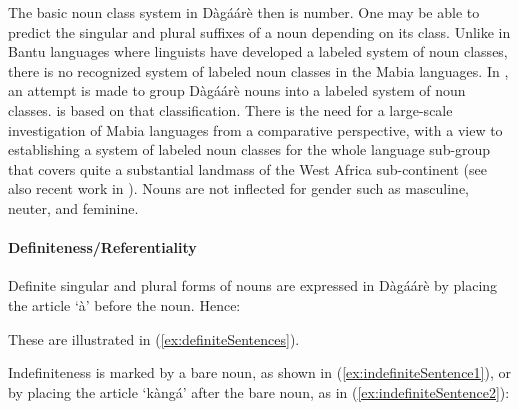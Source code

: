 \begin{refsection}
The basic noun class system in Dàgáárè then is number. One may be able to predict the
singular and plural suffixes of a noun depending on its class. Unlike in Bantu languages
where linguists have developed a labeled system of noun classes, there is no recognized
system of labeled noun classes in the Mabia languages. In \citet{Bodomo1997}, an attempt is made to group Dàgáárè nouns into a labeled system of noun classes.   is
based on that classification. There is the need for a large-scale investigation of Mabia languages from a comparative perspective, with a view to establishing a system of labeled noun classes for the whole language sub-group that covers quite a substantial landmass of the West Africa sub-continent (see also recent work in \citealt{Mieheetal2007}). Nouns are not inflected for gender such as masculine, neuter, and
feminine.

\paragraph{Definiteness/Referentiality}
Definite singular and plural forms of nouns are expressed in Dàgáárè by placing the article ‘à’ before the noun. Hence:

\ea {}
\z \z


These are illustrated in (\ref{ex:definiteSentences}).

\ea\label{ex:definiteSentences} 
\z\z 



Indefiniteness is marked by a bare noun, as shown in (\ref{ex:indefiniteSentence1}), or by placing the article ‘kàngá’
after the bare noun, as in (\ref{ex:indefiniteSentence2}):


\end{refsection}
